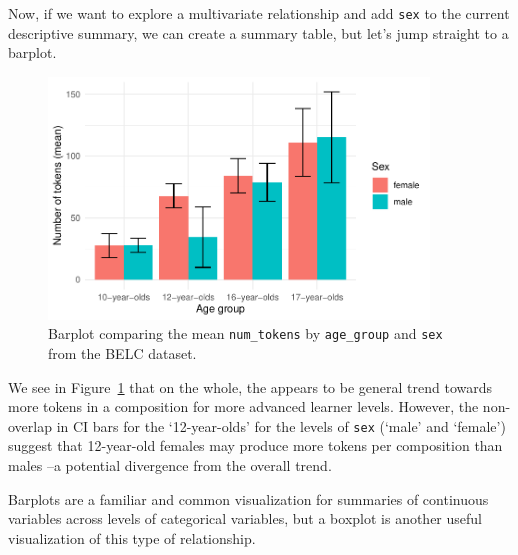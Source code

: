 \documentclass[
  letterpaper,
]{latex/krantz}
\begin{document}
Now, if we want to explore a multivariate relationship and add
\texttt{sex} to the current descriptive summary, we can create a summary
table, but let's jump straight to a barplot.

\begin{figure}

{\centering \includegraphics[width=0.9\textwidth,height=\textheight]{./approaching-analysis_files/figure-pdf/fig-summaries-multivariate-barplot-belc-1.pdf}

}

\caption{\label{fig-summaries-multivariate-barplot-belc}Barplot
comparing the mean \texttt{num\_tokens} by \texttt{age\_group} and
\texttt{sex} from the BELC dataset.}

\end{figure}

We see in Figure~\ref{fig-summaries-multivariate-barplot-belc} that on
the whole, the appears to be general trend towards more tokens in a
composition for more advanced learner levels. However, the non-overlap
in CI bars for the `12-year-olds' for the levels of \texttt{sex} (`male'
and `female') suggest that 12-year-old females may produce more tokens
per composition than males --a potential divergence from the overall
trend.

Barplots are a familiar and common visualization for summaries of
continuous variables across levels of categorical variables, but a
boxplot is another useful visualization of this type of relationship.
\end{document}
